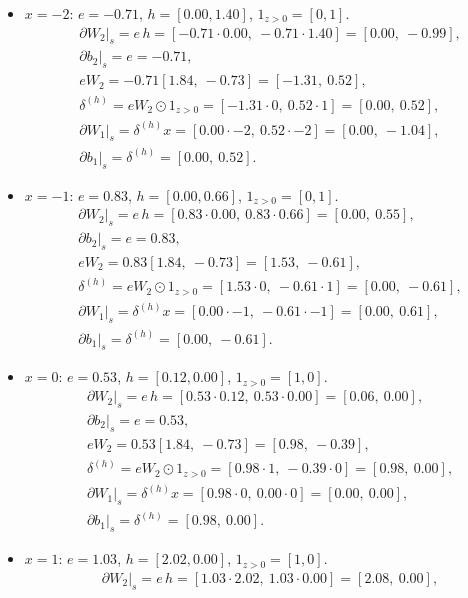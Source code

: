 \documentclass[11pt]{article}
\begin{document}
\begin{itemize}
\item $x=-2$: $e=-0.71$, $h=[0.00, 1.40]$, $1_{z>0}=[0,1]$.
\begin{align*}
&\partial W_2\big|_s = e\,h = [-0.71\cdot0.00,\ -0.71\cdot1.40] = [0.00,\ -0.99],\\
&\partial b_2\big|_s = e = -0.71,\\
&eW_2 = -0.71[1.84,\ -0.73] = [-1.31,\ 0.52],\\
&\delta^{(h)} = eW_2 \odot 1_{z>0} = [-1.31\cdot0,\ 0.52\cdot1] = [0.00,\ 0.52],\\
&\partial W_1\big|_s = \delta^{(h)} x = [0.00\cdot-2,\ 0.52\cdot-2] = [0.00,\ -1.04],\\
&\partial b_1\big|_s = \delta^{(h)} = [0.00,\ 0.52].
\end{align*}
\item $x=-1$: $e=0.83$, $h=[0.00, 0.66]$, $1_{z>0}=[0,1]$.
\begin{align*}
&\partial W_2\big|_s = e\,h = [0.83\cdot0.00,\ 0.83\cdot0.66] = [0.00,\ 0.55],\\
&\partial b_2\big|_s = e = 0.83,\\
&eW_2 = 0.83[1.84,\ -0.73] = [1.53,\ -0.61],\\
&\delta^{(h)} = eW_2 \odot 1_{z>0} = [1.53\cdot0,\ -0.61\cdot1] = [0.00,\ -0.61],\\
&\partial W_1\big|_s = \delta^{(h)} x = [0.00\cdot-1,\ -0.61\cdot-1] = [0.00,\ 0.61],\\
&\partial b_1\big|_s = \delta^{(h)} = [0.00,\ -0.61].
\end{align*}
\item $x=0$: $e=0.53$, $h=[0.12, 0.00]$, $1_{z>0}=[1,0]$.
\begin{align*}
&\partial W_2\big|_s = e\,h = [0.53\cdot0.12,\ 0.53\cdot0.00] = [0.06,\ 0.00],\\
&\partial b_2\big|_s = e = 0.53,\\
&eW_2 = 0.53[1.84,\ -0.73] = [0.98,\ -0.39],\\
&\delta^{(h)} = eW_2 \odot 1_{z>0} = [0.98\cdot1,\ -0.39\cdot0] = [0.98,\ 0.00],\\
&\partial W_1\big|_s = \delta^{(h)} x = [0.98\cdot0,\ 0.00\cdot0] = [0.00,\ 0.00],\\
&\partial b_1\big|_s = \delta^{(h)} = [0.98,\ 0.00].
\end{align*}
\item $x=1$: $e=1.03$, $h=[2.02, 0.00]$, $1_{z>0}=[1,0]$.
\begin{align*}
&\partial W_2\big|_s = e\,h = [1.03\cdot2.02,\ 1.03\cdot0.00] = [2.08,\ 0.00],\\

\end{align*}
\end{itemize}
\end{document}
